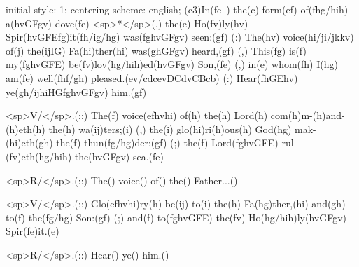 initial-style: 1;
centering-scheme: english;
(c3)In(fe~) the(c) form(ef) of(fhg/hih) a(hvGFgv) dove(fe) <sp>*</sp>(,) the(e) Ho(fv)ly(hv) Spir(hvGFEfg)it(fh/ig/hg) was(fghvGFgv) seen:(gf) (:) The(hv) voice(hi/ji/jkkv) of(j) the(ijIG) Fa(hi)ther(hi) was(ghGFgv) heard,(gf) (,) This(fg) is(f) my(fghvGFE) be(fv)lov(hg/hih)ed(hvGFgv) Son,(fe) (,) in(e) whom(fh) I(hg) am(fe) well(fhf/gh) pleased.(ev/cdcevDCdvCBcb) (:) Hear(fhGEhv) ye(gh/ijhiHGfghvGFgv) him.(gf)

<sp>V/</sp>.(::) The(f) voice(efhvhi) of(h) the(h) Lord(h) com(h)m-(h)and-(h)eth(h) the(h) wa(ij)ters;(i) (,) the(i) glo(hi)ri(h)ous(h) God(hg) mak-(hi)eth(gh) the(f) thun(fg/hg)der:(gf) (;) the(f) Lord(fghvGFE) rul-(fv)eth(hg/hih) the(hvGFgv) sea.(fe)

<sp>R/</sp>.(::) The() voice() of() the() Father...()

<sp>V/</sp>.(::) Glo(efhvhi)ry(h) be(ij) to(i) the(h) Fa(hg)ther,(hi) and(gh) to(f) the(fg/hg) Son:(gf) (;) and(f) to(fghvGFE) the(fv) Ho(hg/hih)ly(hvGFgv) Spir(fe)it.(e)

<sp>R/</sp>.(::) Hear() ye() him.()